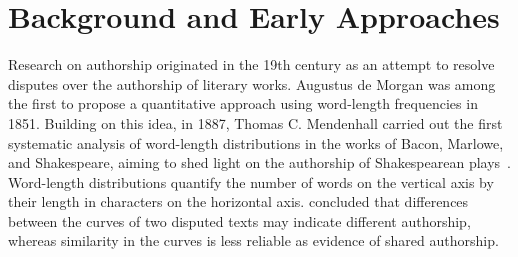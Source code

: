 \section{Background and Early Approaches}
\label{sec:origin}

Research on authorship originated in the 19th century as an attempt to resolve disputes over the authorship of literary works. 
Augustus de Morgan was among the first to propose a quantitative approach using word-length frequencies in 1851. 
Building on this idea, in 1887, Thomas C. Mendenhall carried out the first systematic analysis of word-length distributions in the works of Bacon, Marlowe, and Shakespeare, aiming to shed light on the authorship of Shakespearean plays~\citep{neal_surveying_2018,stamatatos_survey_2009}.
Word-length distributions quantify the number of words on the vertical axis by their length in characters on the horizontal axis. 
\citet{wordlengths_mendenhall_1887} concluded that differences between the curves of two disputed texts may indicate different authorship, whereas similarity in the curves is less reliable as evidence of shared authorship.

